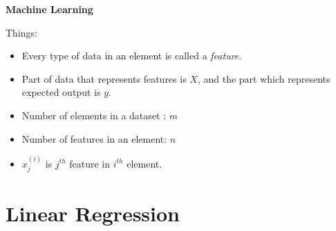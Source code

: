 \documentclass{article}
\begin{document}
\begin{center}
	\LARGE \textbf{Machine Learning}\\
	\vspace{20pt}
\end{center}
\tableofcontents
\large
\vfill
Things:
\begin{itemize}
	\item Every type of data in an element is called a \textit{feature}.
	\item Part of data that represents features is $X$, and the part which represents expected output is $y$.
	\item Number of elements in a dataset : $m$
	\item Number of features in an element: $n$
	\item $x_j^{(i)}$ is $j^{th}$ feature in $i^{th}$ element.
\end{itemize}
\pagebreak
\section{Linear Regression}
\end{document}
